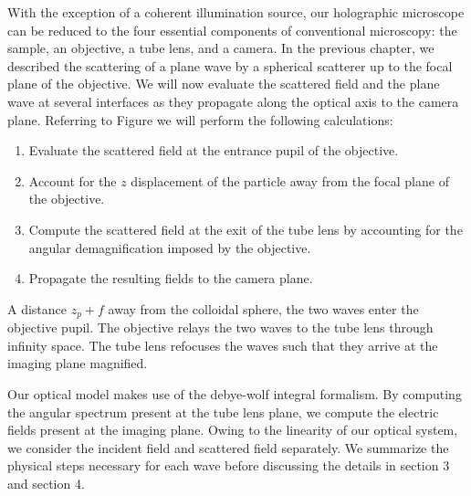 With the exception of a coherent illumination source, our holographic microscope
can be reduced to the four essential components of conventional microscopy: the sample,
an objective, a tube lens, and a camera. In the previous chapter, we described the
scattering of a plane wave by a spherical scatterer up to the focal plane
of the objective. We will now evaluate the scattered field and the plane
wave at several interfaces as they propagate along the optical axis to the
camera plane.
Referring to Figure %
we will perform the following calculations:
\begin{enumerate}
\item Evaluate the scattered field at the entrance pupil of the objective.
\item Account for the  $z$ displacement of the particle away from the focal
  plane of the objective.
\item Compute the scattered field at the exit of the tube lens by accounting
  for the angular demagnification imposed by the objective.
\item Propagate the resulting fields to the camera plane.
\end{enumerate}

A distance $z_p + f$ away from the colloidal sphere, the two waves enter the
objective pupil. The objective relays the two waves to the tube lens through
infinity space. The tube lens refocuses the waves such that they arrive at the imaging
plane magnified.

Our optical model makes use of the debye-wolf integral formalism. By computing the
angular spectrum present at the tube lens plane, we compute the electric fields
present at the imaging plane. Owing to the linearity of our optical system,
we consider the incident field and scattered field separately. We summarize the physical
steps necessary for each wave before discussing the details in section 3 and section 4.

